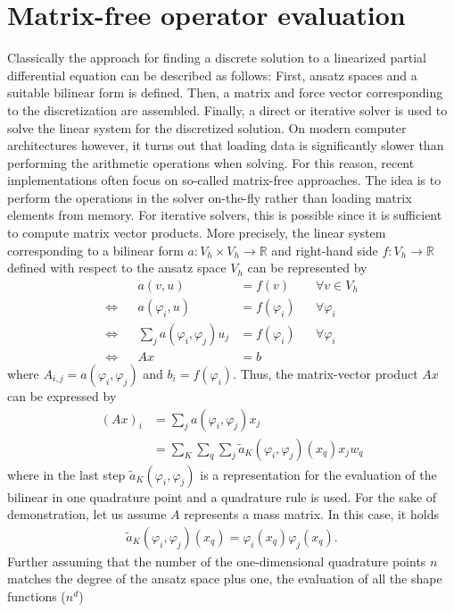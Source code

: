 \documentclass[preprint,12pt,times]{elsarticle}
\begin{document}
\section{Matrix-free operator evaluation}
\label{sec:mf}
Classically the approach for finding a discrete solution to a linearized partial differential equation can be described as follows:
First, ansatz spaces and a suitable bilinear form is defined. Then, a matrix and force vector corresponding to the discretization are assembled.
Finally, a direct or iterative solver is used to solve the linear system for the discretized solution.
On modern computer architectures however, it turns out that loading data is significantly slower than performing the arithmetic operations when solving.
For this reason, recent implementations often focus on so-called matrix-free approaches. The idea is to perform the operations in the solver on-the-fly
rather than loading matrix elements from memory.
For iterative solvers, this is possible since it is sufficient to compute matrix vector products. More precisely, the linear system corresponding to a bilinear form
$a\colon V_h\times V_h\to\mathbb{R}$ and right-hand side $f\colon V_h\to\mathbb{R}$ defined with respect to the ansatz space $V_h$ can be represented by
\begin{align*}
 &&a(v,u) &= f(v) && \forall v\in V_h\\
 \Longleftrightarrow &&a(\varphi_i, u) &= f(\varphi_i) && \forall \varphi_i \\
 \Longleftrightarrow &&\sum_j a(\varphi_i,\varphi_j) u_j &= f(\varphi_i) && \forall \varphi_i \\
 \Longleftrightarrow &&A x &= b
\end{align*}
where $A_{i,j}=a(\varphi_i, \varphi_j)$ and $b_i= f(\varphi_i)$.
Thus, the matrix-vector product $Ax$ can be expressed by
\begin{align*}
 (Ax)_i &= \sum_j a(\varphi_i,\varphi_j) x_j \\
        &= \sum_K\sum_q \sum_j \tilde{a}_K(\varphi_i,\varphi_j)(x_q) x_j w_q
\end{align*}
where in the last step $\tilde{a}_K(\varphi_i,\varphi_j)$ is a representation for the evaluation of the bilinear in one quadrature point and a quadrature rule is used.
For the sake of demonstration, let us assume $A$ represents a mass matrix. In this case, it holds
\begin{align*}
 \tilde{a}_K(\varphi_i,\varphi_j)(x_q) = \varphi_i(x_q)\varphi_j(x_q).
\end{align*}
Further assuming that the number of the one-dimensional quadrature points $n$ matches the degree of the ansatz space plus one, the evaluation of all the shape functions ($n^d$)
\end{document}

